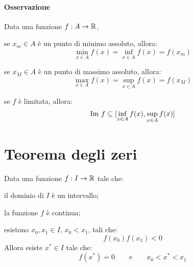 \paragraph{Osservazione}
Data una funzione $f:A\rightarrow\mathbb{R}$,
\begin{aenumerate}
\item se $x_m\in A$ è un punto di minimo assoluto, allora:
\[\min_{x\in A}{f(x)}=\inf_{x\in A}{f(x)}=f(x_m)\]
\item se $x_M\in A$ è un punto di massimo assoluto, allora:
\[\max_{x\in A}{f(x)}=\sup_{x\in A}{f(x)}=f(x_M)\]
\item se $f$ è limitata, allora:
\[\text{Im } f \subseteq [\inf_{x\in A}{f(x)}, \sup_{x\in A}{f(x)}] \]
\end{aenumerate}

\section{Teorema degli zeri}
Data una funzione $f:I\rightarrow\mathbb{R}$ tale che:
\begin{aenumerate}
\item il dominio di $I$ è un intervallo;
\item la funzione $f$ è continua;
\item esistono $x_0,x_1\in I$, $x_0<x_1$, tali che:
\[f(x_0)f(x_1)<0\]
Allora esiste $x^*\in I$ tale che:
\[f(x^*)=0 \qquad \text{e} \qquad x_0<x^*<x_1\]
\end{aenumerate}